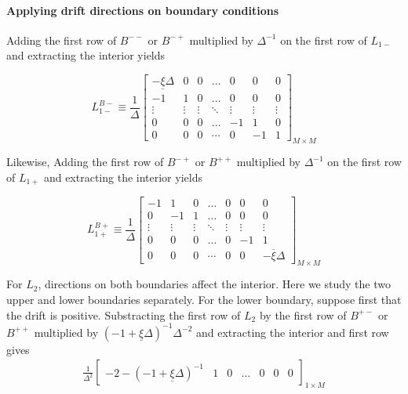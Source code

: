 \documentclass[11pt]{article}
\theoremstyle{definition}
\begin{document}
\paragraph{Applying drift directions on boundary conditions}
Adding the first row of $B^{--}$ or $B^{-+}$ multiplied by $\Delta^{-1}$ on the first row of $L_{1-}$ and extracting the interior yields

\begin{equation}
L_{1-}^{B-} \equiv \frac{1}{\Delta}\begin{bmatrix}
-\underline{\xi} \Delta &0&0&\dots&0&0&0\\
-1&1&0&\dots&0&0&0\\
\vdots&\vdots&\vdots&\ddots&\vdots&\vdots&\vdots\\
0&0&0&\dots&-1&1&0\\
0&0&0&\cdots&0&-1&1
\end{bmatrix}_{M\times M} \label{eq:L-1-regular-left}
\end{equation}

Likewise,
Adding the first row of $B^{-+}$ or $B^{++}$ multiplied by $\Delta^{-1}$ on the first row of $L_{1+}$ and extracting the interior yields

\begin{equation}
L_{1+}^{B+} \equiv \frac{1}{\Delta}\begin{bmatrix}
-1 &1&0&\dots&0&0&0\\
0&-1&1&\dots&0&0&0\\
\vdots&\vdots&\vdots&\ddots&\vdots&\vdots&\vdots\\
0&0&0&\dots&0&-1&1\\
0&0&0&\cdots&0&0&-\overline{\xi} \Delta
\end{bmatrix}_{M\times M} \label{eq:L-1p-regular-right}
\end{equation}

For $L_2$, directions on both boundaries affect the interior. Here we study the two upper and lower boundaries separately. For the lower boundary, suppose first that the drift is positive. Substracting the first row of $L_2$ by the first row of $B^{+-}$ or $B^{++}$ multiplied by $(-1 + \underline{\xi} \Delta )^{-1} \Delta^{-2}$ and extracting the interior and first row gives
\begin{align}
\frac{1}{\Delta^2}\begin{bmatrix}
-2 - (-1 + \underline{\xi}\Delta)^{-1} &1&0&\dots&0&0&0
\end{bmatrix}_{1\times M}
\end{align}
\end{document}
